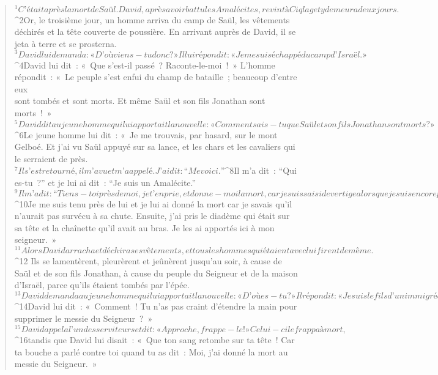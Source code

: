   
  
    
      
         
      \bchapter{}
      \begin{verse}
${}^{1}C’était après la mort de Saül. David, après avoir battu les Amalécites, revint à Ciqlag et y demeura deux jours. 
${}^{2}Or, le troisième jour, un homme arriva du camp de Saül, les vêtements déchirés et la tête couverte de poussière. En arrivant auprès de David, il se jeta à terre et se prosterna. 
${}^{3}David lui demanda : « D’où viens-tu donc ? » Il lui répondit : « Je me suis échappé du camp d’Israël. » 
${}^{4}David lui dit : « Que s’est-il passé ? Raconte-le-moi ! » L’homme répondit : « Le peuple s’est enfui du champ de bataille ; beaucoup d’entre eux\\sont tombés et sont morts. Et même Saül et son fils Jonathan sont morts ! » 
${}^{5}David dit au jeune homme qui lui apportait la nouvelle : « Comment sais-tu que Saül et son fils Jonathan sont morts ? » 
${}^{6}Le jeune homme lui dit : « Je me trouvais, par hasard, sur le mont Gelboé. Et j’ai vu Saül appuyé sur sa lance, et les chars et les cavaliers qui le serraient de près. 
${}^{7}Il s’est retourné, il m’a vu et m’a appelé. J’ai dit : “Me voici.” 
${}^{8}Il m’a dit : “Qui es-tu ?” et je lui ai dit : “Je suis un Amalécite.” 
${}^{9}Il m’a dit : “Tiens-toi près de moi, je t’en prie, et donne-moi la mort, car je suis saisi de vertige alors que je suis encore plein de vie.” 
${}^{10}Je me suis tenu près de lui et je lui ai donné la mort car je savais qu’il n’aurait pas survécu à sa chute. Ensuite, j’ai pris le diadème qui était sur sa tête et la chaînette qu’il avait au bras. Je les ai apportés ici à mon seigneur. »
${}^{11}Alors David arracha et déchira ses vêtements, et tous les hommes qui étaient avec lui firent de même.  
${}^{12} Ils se lamentèrent, pleurèrent et jeûnèrent jusqu’au soir, à cause de Saül et de son fils Jonathan, à cause du peuple du Seigneur et de la maison d’Israël, parce qu’ils étaient tombés par l’épée.
${}^{13}David demanda au jeune homme qui lui apportait la nouvelle : « D’où es-tu ? » Il répondit : « Je suis le fils d’un immigré amalécite. » 
${}^{14}David lui dit : « Comment ! Tu n’as pas craint d’étendre la main pour supprimer le messie du Seigneur ? » 
${}^{15}David appela l’un des serviteurs et dit : « Approche, frappe-le ! » Celui-ci le frappa à mort, 
${}^{16}tandis que David lui disait : « Que ton sang retombe sur ta tête ! Car ta bouche a parlé contre toi quand tu as dit : Moi, j’ai donné la mort au messie du Seigneur. »

\end{verse}
